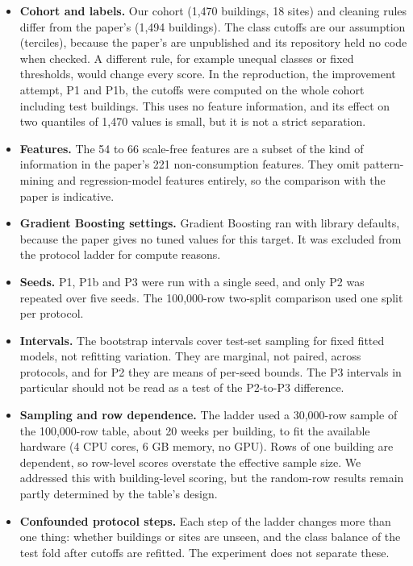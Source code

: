 \documentclass[
  10pt,
]{article}
\providecommand{\tightlist}{%
  \setlength{\itemsep}{0pt}\setlength{\parskip}{0pt}}
\begin{document}
\begin{itemize}
\tightlist
\item
  \textbf{Cohort and labels.} Our cohort (1,470 buildings, 18 sites) and
  cleaning rules differ from the paper's (1,494 buildings). The class
  cutoffs are our assumption (terciles), because the paper's are
  unpublished and its repository held no code when checked. A different
  rule, for example unequal classes or fixed thresholds, would change
  every score. In the reproduction, the improvement attempt, P1 and P1b,
  the cutoffs were computed on the whole cohort including test
  buildings. This uses no feature information, and its effect on two
  quantiles of 1,470 values is small, but it is not a strict separation.
\item
  \textbf{Features.} The 54 to 66 scale-free features are a subset of
  the kind of information in the paper's 221 non-consumption features.
  They omit pattern-mining and regression-model features entirely, so
  the comparison with the paper is indicative.
\item
  \textbf{Gradient Boosting settings.} Gradient Boosting ran with
  library defaults, because the paper gives no tuned values for this
  target. It was excluded from the protocol ladder for compute reasons.
\item
  \textbf{Seeds.} P1, P1b and P3 were run with a single seed, and only
  P2 was repeated over five seeds. The 100,000-row two-split comparison
  used one split per protocol.
\item
  \textbf{Intervals.} The bootstrap intervals cover test-set sampling
  for fixed fitted models, not refitting variation. They are marginal,
  not paired, across protocols, and for P2 they are means of per-seed
  bounds. The P3 intervals in particular should not be read as a test of
  the P2-to-P3 difference.
\item
  \textbf{Sampling and row dependence.} The ladder used a 30,000-row
  sample of the 100,000-row table, about 20 weeks per building, to fit
  the available hardware (4 CPU cores, 6 GB memory, no GPU). Rows of one
  building are dependent, so row-level scores overstate the effective
  sample size. We addressed this with building-level scoring, but the
  random-row results remain partly determined by the table's design.
\item
  \textbf{Confounded protocol steps.} Each step of the ladder changes
  more than one thing: whether buildings or sites are unseen, and the
  class balance of the test fold after cutoffs are refitted. The
  experiment does not separate these.

\end{itemize}
\end{document}
